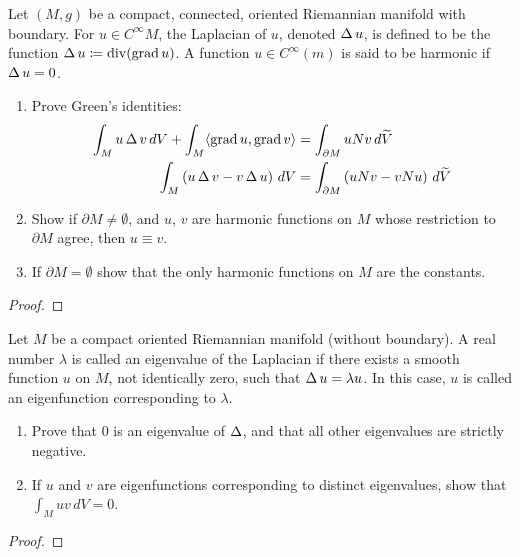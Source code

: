 \begin{problem}
Let $(M,g)$ be a compact, connected, oriented Riemannian manifold with
boundary. For $u\in C^\infty M$, the Laplacian of $u$, denoted $\operatorname{\Delta} u$,
is defined to be the function $\operatorname{\Delta} u\coloneqq \operatorname{div}(\operatorname{grad} u)$. A function
$u\in C^\infty(m)$ is said to be harmonic if $\operatorname{\Delta} u=0$.
\begin{enumerate}[label=(\alph*)]
\item Prove Green's identities:
\begin{align*}
\int_M u\operatorname{\Delta} v\,dV+\int_M\langle\operatorname{grad} u,\operatorname{grad} v\rangle
&=\int_{\partial M}uNv\,d\widetilde V\\
\int_M\left(u\operatorname{\Delta} v-v\operatorname{\Delta} u\right)\,dV
&=\int_{\partial M}\left(uNv-vNu\right)\,d\widetilde V
\end{align*}
\item Show if $\partial M\neq\emptyset$, and $u$, $v$ are harmonic
  functions on $M$ whose restriction to $\partial M$ agree, then $u\equiv
  v$.
\item If $\partial M=\emptyset$ show that the only harmonic functions on
  $M$ are the constants.
\end{enumerate}
\end{problem}
\begin{proof}
\end{proof}
\newpage

\begin{problem}
Let $M$ be a compact oriented Riemannian manifold (without boundary). A
real number $\lambda$ is called an eigenvalue of the Laplacian if
there exists a smooth function $u$ on $M$, not identically zero, such
that $\operatorname{\Delta} u=\lambda u$. In this case, $u$ is called an eigenfunction
corresponding to $\lambda$.
\begin{enumerate}[label=(\alph*)]
\item Prove that $0$ is an eigenvalue of $\operatorname{\Delta}$, and that all other
  eigenvalues are strictly negative.
\item If $u$ and $v$ are eigenfunctions corresponding to distinct
  eigenvalues, show that $\int_M uv\,dV=0$.
\end{enumerate}
\end{problem}
\begin{proof}
\end{proof}


